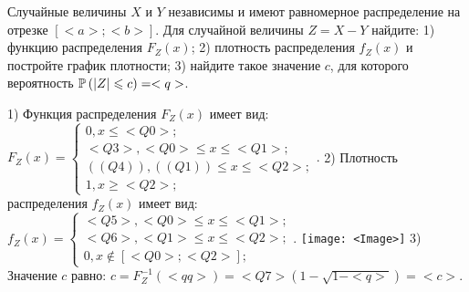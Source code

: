 \documentclass{article}%
\begin{document}
\begin{problem}
Случайные величины $X$ и $Y$ независимы и имеют равномерное
распределение на отрезке $[<a>;<b>]$. Для случайной величины $Z=X-Y$ найдите:
1) функцию распределения $F_Z(x)$;
2) плотность распределения $f_Z(x)$ и постройте график плотности;
3) найдите такое значение $c$, для которого вероятность $\P(|Z|\leqslant c)=<q>$.
\end{problem}

\begin{solution*}
1) Функция распределения $F_Z(x)$ имеет вид:
$
F_Z(x)=\left\{
\begin{array}{l}
0, x\leqslant <Q0>;\\
<Q3>, <Q0>\leqslant x\leqslant <Q1>;\\
((Q4)), ((Q1))\leqslant x\leqslant <Q2>;\\
1, x\geqslant <Q2>;
\end{array}.
\right.
$
2) Плотность распределения $f_Z(x)$ имеет вид:
$
f_Z(x)=\left\{
\begin{array}{l}
<Q5>, <Q0>\leqslant x\leqslant <Q1>;\\
<Q6>, <Q1>\leqslant x\leqslant <Q2>;\\
0, x\not\in [<Q0>;<Q2>];
\end{array}.
\right.
$
\texttt{[image: <Image>]}
3) Значение $c$ равно:
$
c=F_Z^{-1}(<qq>)=<Q7>\left(1-\sqrt{1-<q>}\right)=
<c>.
$
\end{solution*}
\end{document}
